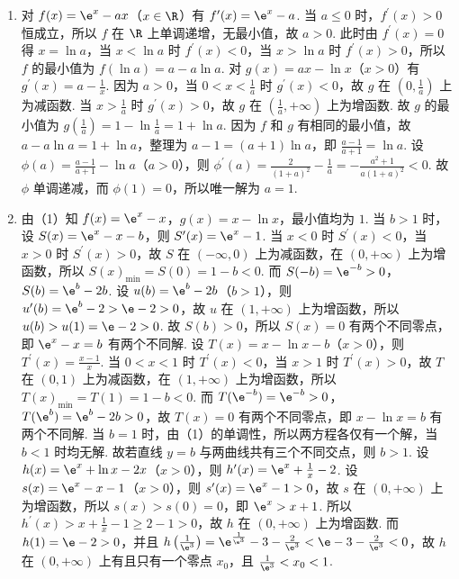 \begin{solution}
\begin{enumerate}
\item 对 \(f(x)=\e^x-ax\)（\(x\in\R\)）有 \(f^{\prime}(x)=\e^x-a\).
当 \(a\le 0\) 时，\(f^{\prime}(x)>0\) 恒成立，所以 \(f\) 在 \(\R\) 上单调递增，无最小值，故 \(a>0\).
此时由 \(f^{\prime}(x)=0\) 得 \(x=\ln a\)，当 \(x<\ln a\) 时 \(f^{\prime}(x)<0\)，当 \(x>\ln a\) 时 \(f^{\prime}(x)>0\)，所以 \(f\) 的最小值为 \(f(\ln a)=a-a\ln a\).
对 \(g(x)=ax-\ln x\)（\(x>0\)）有 \(g^{\prime}(x)=a-\frac1x\).
因为 \(a>0\)，当 \(0<x<\frac1a\) 时 \(g^{\prime}(x)<0\)，故 \(g\) 在 \(\left(0,\frac1a\right)\) 上为减函数.
当 \(x>\frac1a\) 时 \(g^{\prime}(x)>0\)，故 \(g\) 在 \(\left(\frac1a,+\infty\right)\) 上为增函数.
故 \(g\) 的最小值为 \(g\left(\frac1a\right)=1-\ln\frac1a=1+\ln a\).
因为 \(f\) 和 \(g\) 有相同的最小值，故 \(a-a\ln a=1+\ln a\)，整理为 \(a-1=(a+1)\ln a\)，即 \(\frac{a-1}{a+1}=\ln a\).
设 \(\phi(a)=\frac{a-1}{a+1}-\ln a\)（\(a>0\)），则 \(\phi^{\prime}(a)=\frac{2}{(1+a)^2}-\frac1a=-\frac{a^2+1}{a(1+a)^2}<0\).
故 \(\phi\) 单调递减，而 \(\phi(1)=0\)，所以唯一解为 \(a=1\).
\item 由（1）知 \(f(x)=\e^x-x\)，\(g(x)=x-\ln x\)，最小值均为 \(1\).
当 \(b>1\) 时，设 \(S(x)=\e^x-x-b\)，则 \(S^{\prime}(x)=\e^x-1\).
当 \(x<0\) 时 \(S^{\prime}(x)<0\)，当 \(x>0\) 时 \(S^{\prime}(x)>0\)，故 \(S\) 在 \((-\infty,0)\) 上为减函数，在 \((0,+\infty)\) 上为增函数，所以 \(S(x)_{\min}=S(0)=1-b<0\).
而 \(S(-b)=\e^{-b}>0\)，\(S(b)=\e^b-2b\).
设 \(u(b)=\e^b-2b\)（\(b>1\)），则 \(u^{\prime}(b)=\e^b-2>\e-2>0\)，故 \(u\) 在 \((1,+\infty)\) 上为增函数，所以 \(u(b)>u(1)=\e-2>0\).
故 \(S(b)>0\)，所以 \(S(x)=0\) 有两个不同零点，即 \(\e^x-x=b\) 有两个不同解.
设 \(T(x)=x-\ln x-b\)（\(x>0\)），则 \(T^{\prime}(x)=\frac{x-1}{x}\).
当 \(0<x<1\) 时 \(T^{\prime}(x)<0\)，当 \(x>1\) 时 \(T^{\prime}(x)>0\)，故 \(T\) 在 \((0,1)\) 上为减函数，在 \((1,+\infty)\) 上为增函数，所以 \(T(x)_{\min}=T(1)=1-b<0\).
而 \(T(\e^{-b})=\e^{-b}>0\)，\(T(\e^b)=\e^b-2b>0\)，故 \(T(x)=0\) 有两个不同零点，即 \(x-\ln x=b\) 有两个不同解.
当 \(b=1\) 时，由（1）的单调性，所以两方程各仅有一个解，当 \(b<1\) 时均无解.
故若直线 \(y=b\) 与两曲线共有三个不同交点，则 \(b>1\).
设 \(h(x)=\e^x+\ln x-2x\)（\(x>0\)），则 \(h^{\prime}(x)=\e^x+\frac1x-2\).
设 \(s(x)=\e^x-x-1\)（\(x>0\)），则 \(s^{\prime}(x)=\e^x-1>0\)，故 \(s\) 在 \((0,+\infty)\) 上为增函数，所以 \(s(x)>s(0)=0\)，即 \(\e^x>x+1\).
所以 \(h^{\prime}(x)>x+\frac1x-1\ge 2-1>0\)，故 \(h\) 在 \((0,+\infty)\) 上为增函数.
而 \(h(1)=\e-2>0\)，并且 \(h\left(\frac1{\e^3}\right)=\e^{\frac1{\e^3}}-3-\frac2{\e^3}<\e-3-\frac2{\e^3}<0\)，故 \(h\) 在 \((0,+\infty)\) 上有且只有一个零点 \(x_0\)，且 \(\frac1{\e^3}<x_0<1\).

\end{enumerate}
\end{solution}
